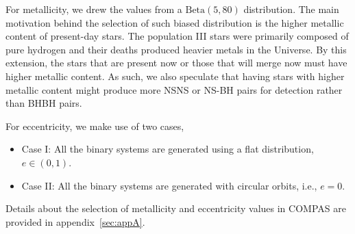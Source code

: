 \documentclass[journal, twocolumn]{IEEEtran}
\begin{document}
    For metallicity, we drew the values from a $\text{Beta}(5, 80)$ distribution.
    The main motivation behind the selection of such biased distribution is the higher metallic content of present-day stars.
    The population III stars were primarily composed of pure hydrogen and their deaths produced heavier metals in the Universe.
    By this extension, the stars that are present now or those that will merge now must have higher metallic content.
    As such, we also speculate that having stars with higher metallic content might produce more NSNS or NS-BH pairs for detection rather than BHBH pairs.

    For eccentricity, we make use of two cases,
    \begin{itemize}
        \item Case I: All the binary systems are generated using a flat distribution, $e \in (0, 1)$.
        \item Case II: All the binary systems are generated with circular orbits, i.e., $e = 0$.
    \end{itemize}

    Details about the selection of metallicity and eccentricity values in COMPAS are provided in appendix~\ref{sec:appA}.
\end{document}
